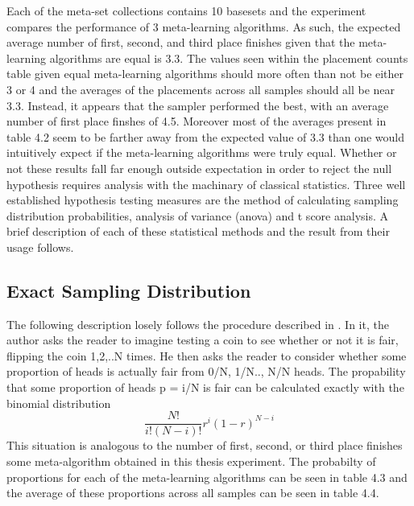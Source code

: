 Each of the meta-set collections contains 10 basesets and the experiment
compares the performance of 3 meta-learning algorithms. As such, the expected
average number of first, second, and third place finishes given that the
meta-learning algorithms are equal is 3.3. The values seen within the placement
counts table given equal meta-learning algorithms should more often than not be
either 3 or 4 and the averages of the placements across all samples should all
be near 3.3. Instead, it appears that the sampler performed the best,
with an average number of first place finshes of 4.5. Moreover most of the
averages present in table 4.2 seem to be farther away from the expected value of
3.3 than one would intuitively expect if the meta-learning algorithms were
truly equal. Whether or not these results fall far enough outside
expectation in order to reject the null hypothesis requires analysis with the
machinary of classical statistics. Three well established hypothesis testing
measures are the method of calculating sampling distribution probabilities,
analysis of variance (anova) and t score analysis. A brief description of each
of these statistical methods and the result from their usage follows.

\subsection{Exact Sampling Distribution}
The following description losely follows the procedure described in \cite{Cohen}.
In it, the author asks the reader to imagine testing a coin to see whether or
not it is fair, flipping the coin 1,2,..N times. He then asks the reader to
consider whether some proportion of heads is actually fair from 0/N, 1/N.., N/N
heads. The propability that some proportion of heads p = i/N is fair can be
calculated exactly with the binomial distribution
$$\frac{N!}{i!(N-i)!}r^{i}(1-r)^{N-i}$$
This situation is analogous to the number of first, second, or third place
finishes some meta-algorithm obtained in this thesis experiment. The probabilty
of proportions for each of the meta-learning algorithms can be seen in table 4.3
and the average of these proportions across all samples can be seen in table 4.4.

